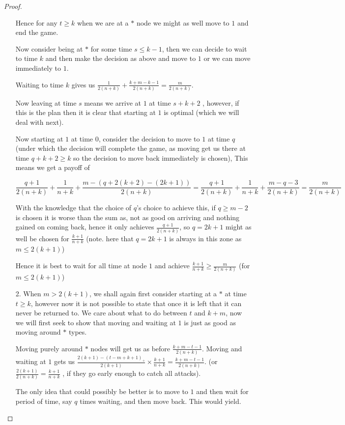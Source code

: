 \documentclass[a4paper,10pt]{article}
\theoremstyle{definition}
\theoremstyle{definition}
\theoremstyle{remark}
\theoremstyle{definition}
\begin{document}
\begin{proof}
\begin{itemize}
Hence for any $t \geq k$ when we are at a $*$ node we might as well move to $1$ and end the game.


Now consider being at $*$ for some time $s \leq k-1$, then we can decide to wait to time $k$ and then make the decision as above and move to $1$ or we can move immediately to $1$.

Waiting to time $k$ gives us $\frac{1}{2(n+k)} + \frac{k+m-k-1}{2(n+k)}=\frac{m}{2(n+k)}$.

Now leaving at time $s$ means we arrive at $1$ at time $s+k+2$ , however, if this is the plan then it is clear that starting at $1$ is optimal (which we will deal with next).

Now starting at $1$ at time $0$, consider the decision to move to $1$ at time $q$ (under which the decision will complete the game, as moving get us there at time $q+k+2 \geq k$ so the decision to move back immediately is chosen), This means we get a payoff of

$$ \frac{q+1}{2(n+k)} +\frac{1}{n+k} + \frac{m-(q+2(k+2)-(2k+1))}{2(n+k)}
=\frac{q+1}{2(n+k)}+\frac{1}{n+k}+\frac{m-q-3}{2(n+k)}=\frac{m}{2(n+k)} $$

With the knowledge that the choice of $q$'s choice to achieve this, if $q \geq m-2$ is chosen it is worse than the sum as, not as good on arriving and nothing gained on coming back, hence it only achieves $\frac{q+1}{2(n+k)}$, so $q=2k+1$ might as well be chosen for $\frac{k+1}{n+k}$ (note. here that $q=2k+1$ is always in this zone as $m \leq 2(k+1)$)

Hence it is best to wait for all time at node $1$ and achieve $\frac{k+1}{n+k} \geq \frac{m}{2(n+k)}$ (for $m \leq 2(k+1)$)

\item[2.] When $m > 2(k+1)$, we shall again first consider starting at a $*$ at time $t \geq k$, however now it is not possible to state that once it is left that it can never be returned to.
We care about what to do between $t$ and $k+m$, now we will first seek to show that moving and waiting at $1$ is just as good as moving around $*$ types.

Moving purely around $*$ nodes will get us as before $\frac{k+m-t-1}{2(n+k)}$.
Moving and waiting at $1$ gets us $\frac{2(k+1)-(t-m+k+1)_{+}}{2(k+1)} \times \frac{k+1}{n+k}=\frac{k+m-t-1}{2(n+k)}$. (or $\frac{2(k+1)}{2(n+k)}=\frac{k+1}{n+k}$ , if they go early enough to catch all attacks).

The only idea that could possibly be better is to move to $1$ and then wait for period of time, say $q$ times waiting, and then move back. This would yield.


\end{itemize}
\end{proof}
\end{document}
